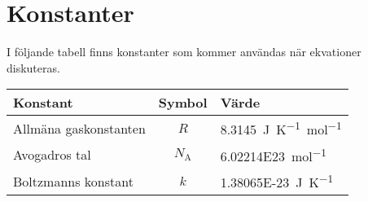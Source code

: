 \section{Konstanter}

I följande tabell finns konstanter som kommer användas när ekvationer diskuteras.

\begin{table}[!h]
	\centering
	\begin{tabular}{| l | c | l |}
		\hline
		\textbf{Konstant} & \multicolumn{1}{|l|}{\textbf{Symbol}} & \multicolumn{1}{|l|}{\textbf{Värde}} \\
		\hline
		Allmäna gaskonstanten & $R$           & \SI{8.3145}{\joule~\kelvin^{-1}~\mol^{-1}} \\
		\hline
		Avogadros tal         & $N_\text{A}$  & \SI{6.02214E23}{\mol^{-1}} \\
		\hline
		Boltzmanns konstant   & $k$           & \SI{1.38065E-23}{\joule~\kelvin^{-1}} \\
		\hline
	\end{tabular}
\end{table}